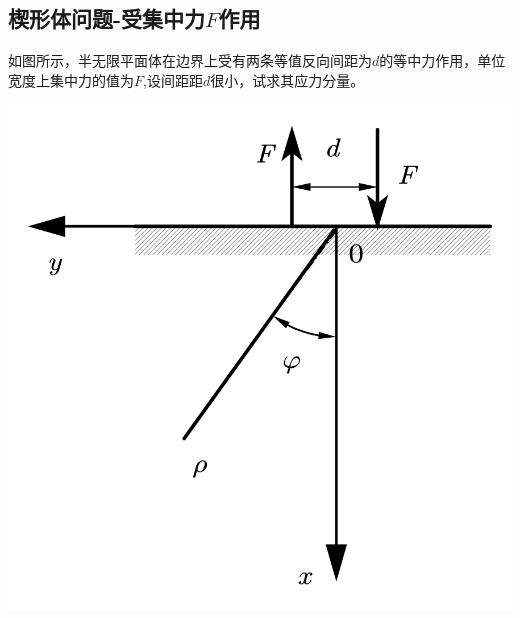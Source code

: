 \subsection{楔形体问题-受集中力$F$作用}
\begin{example}
	如图所示，半无限平面体在边界上受有两条等值反向间距为$d$的等中力作用，单位宽度上集中力的值为$F$,设间距距$d$很小，试求其应力分量。
\end{example}
\centerline{\includegraphics[scale=0.45]{figure/4-15.png}}
